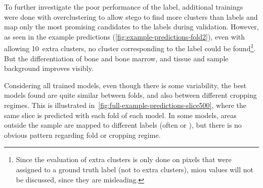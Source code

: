 To further investigate the poor performance of the  label, additional trainings were done with overclustering to allow \gls{stego} to find more clusters than labels and map only the most promising candidates to the labels during validation.
However, as seen in the example predictions (\autoref{fig:example-predictions-fold2}), even with allowing 10~extra clusters, no cluster corresponding to the  label could be found\footnote{Since the evaluation of extra clusters is only done on pixels that were assigned to a ground truth label (not to extra clusters), \gls{miou} values will not be discussed, since they are misleading.}.
But the differentiation of bone and bone marrow, and tissue and sample background improves visibly.

Considering all trained models, even though there is some variability, the best models found are quite similar between folds, and also between different cropping regimes.
This is illustrated in~\autoref{fig:full-example-predictions-slice500}, where the same slice is predicted with each fold of each model.
In some models, areas outside the sample are mapped to different labels (often  or ), but there is no obvious pattern regarding fold or cropping regime.


